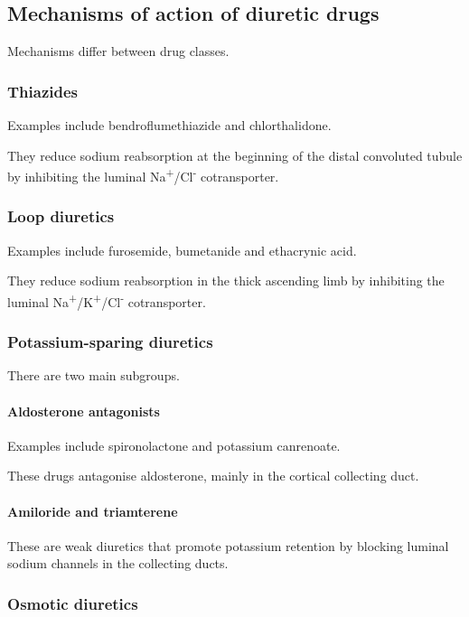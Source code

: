 \documentclass[11pt,a4paper]{article}
\begin{document}
\subsection{Mechanisms of action of diuretic drugs}

Mechanisms differ between drug classes.

\subsubsection{Thiazides}

Examples include bendroflumethiazide and chlorthalidone.

They reduce sodium reabsorption at the beginning of the distal convoluted tubule by inhibiting the luminal Na\textsuperscript{+}/Cl\textsuperscript{-} cotransporter.

\subsubsection{Loop diuretics}

Examples include furosemide, bumetanide and ethacrynic acid.

They reduce sodium reabsorption in the thick ascending limb by inhibiting the luminal Na\textsuperscript{+}/K\textsuperscript{+}/Cl\textsuperscript{-} cotransporter.

\subsubsection{Potassium-sparing diuretics}

There are two main subgroups.

\paragraph{Aldosterone antagonists}

Examples include spironolactone and potassium canrenoate.

These drugs antagonise aldosterone, mainly in the cortical collecting duct.

\paragraph{Amiloride and triamterene}

These are weak diuretics that promote potassium retention by blocking luminal sodium channels in the collecting ducts.

\subsubsection{Osmotic diuretics}
\end{document}
